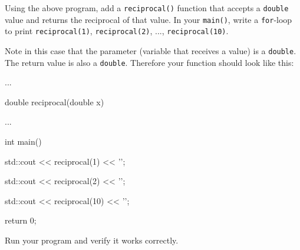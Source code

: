 Using the above program, add a \texttt{reciprocal()} function that accepts a \texttt{double} value and returns the reciprocal of that value. In your \texttt{main()}, write a \texttt{for}-loop to print \texttt{reciprocal(1)}, \texttt{reciprocal(2)}, ..., \texttt{reciprocal(10)}.



Note in this case that the parameter (variable that receives a value) is a \texttt{double}. The return value is also a \texttt{double}. Therefore your function should look like this:



\begin{consolethree}[escapeinside=||]

...

double reciprocal(double x)

{

    ...

}



int main()

{

    std::cout << reciprocal(1) << '\n';

    std::cout << reciprocal(2) << '\n';

    std::cout << reciprocal(10) << '\n';

    return 0;

}

\end{consolethree}



Run your program and verify it works correctly.

